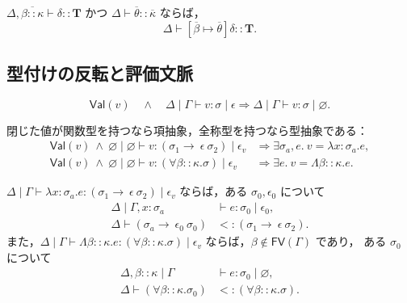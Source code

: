 \begin{lemma}[宣言型の具体化]
\label{lem:fxi-declaration-instantiation}
$\Delta,\overline{\beta::\kappa}\vdash
\delta::\mathbf{T}$ かつ
$\Delta\vdash\overline{\theta}::\overline{\kappa}$
ならば，
\[
  \Delta\vdash
    [\overline{\beta}\mapsto\overline{\theta}]
      \delta::\mathbf{T}.
\]
\end{lemma}

\subsection{型付けの反転と評価文脈}

\begin{lemma}[値の空効果]
\label{lem:fxi-value-pure}
\[
  \mathsf{Val}(v)
  \quad\land\quad
  \Delta\mid\Gamma\vdash v:\sigma\mid\epsilon
  \Longrightarrow
  \Delta\mid\Gamma\vdash v:\sigma\mid\varnothing.
\]
\end{lemma}

\begin{lemma}
\label{lem:fxi-canonical-forms}
閉じた値が関数型を持つなら項抽象，全称型を持つなら型抽象である：
\begin{align*}
  \mathsf{Val}(v)
  \ \land\
  \varnothing\mid\varnothing\vdash
    v:(\sigma_1\rightarrow~\epsilon~\sigma_2)
      \mid\epsilon_v
  &\Longrightarrow
    \exists\sigma_a,e.\ v=\lambda x:\sigma_a.e,\\
  \mathsf{Val}(v)
  \ \land\
  \varnothing\mid\varnothing\vdash
    v:(\forall\beta::\kappa.\sigma)
      \mid\epsilon_v
  &\Longrightarrow
    \exists e.\ v=\Lambda\beta::\kappa.e.
\end{align*}
\end{lemma}

\begin{lemma}[抽象の型付けの反転]
\label{lem:fxi-abstraction-inversion}
$\Delta\mid\Gamma\vdash
\lambda x:\sigma_a.e:
(\sigma_1\rightarrow~\epsilon~\sigma_2)\mid\epsilon_v$
ならば，ある $\sigma_0,\epsilon_0$ について
\[
  \begin{aligned}
    \Delta\mid\Gamma,x:\sigma_a
      &\vdash e:\sigma_0\mid\epsilon_0,\\
    \Delta\vdash
      (\sigma_a\rightarrow~\epsilon_0~\sigma_0)
      &<: (\sigma_1\rightarrow~\epsilon~\sigma_2).
  \end{aligned}
\]
また，$\Delta\mid\Gamma\vdash
\Lambda\beta::\kappa.e:
(\forall\beta::\kappa.\sigma)\mid\epsilon_v$
ならば，$\beta\notin\mathsf{FV}(\Gamma)$ であり，
ある $\sigma_0$ について
\[
  \begin{aligned}
    \Delta,\beta::\kappa\mid\Gamma
      &\vdash e:\sigma_0\mid\varnothing,\\
    \Delta\vdash
      (\forall\beta::\kappa.\sigma_0)
      &<: (\forall\beta::\kappa.\sigma).
  \end{aligned}
\]
\end{lemma}

